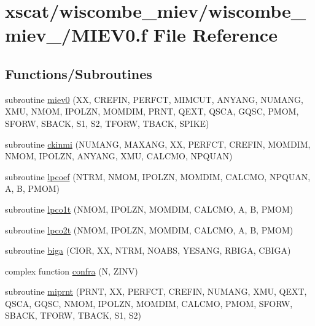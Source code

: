 \hypertarget{wiscombe__miev__1_2_m_i_e_v0_8f}{}\section{xscat/wiscombe\+\_\+miev/wiscombe\+\_\+miev\+\_/\+M\+I\+E\+V0.f File Reference}
\label{wiscombe__miev__1_2_m_i_e_v0_8f}
\subsection*{Functions/\+Subroutines}
\begin{DoxyCompactItemize}
\item 
subroutine \hyperlink{wiscombe__miev__1_2_m_i_e_v0_8f_a48092e733ab76cc9db0501ed3b28d9ff}{miev0} (XX, C\+R\+E\+F\+IN, P\+E\+R\+F\+CT, M\+I\+M\+C\+UT, A\+N\+Y\+A\+NG, N\+U\+M\+A\+NG, X\+MU, N\+M\+OM, I\+P\+O\+L\+ZN, M\+O\+M\+D\+IM, P\+R\+NT, Q\+E\+XT, Q\+S\+CA, G\+Q\+SC, P\+M\+OM, S\+F\+O\+RW, S\+B\+A\+CK, S1, S2, T\+F\+O\+RW, T\+B\+A\+CK, S\+P\+I\+KE)
\item 
subroutine \hyperlink{wiscombe__miev__1_2_m_i_e_v0_8f_aeb0cfc95aa7e21e9ada7c4cb634d6c92}{ckinmi} (N\+U\+M\+A\+NG, M\+A\+X\+A\+NG, XX, P\+E\+R\+F\+CT, C\+R\+E\+F\+IN, M\+O\+M\+D\+IM, N\+M\+OM, I\+P\+O\+L\+ZN, A\+N\+Y\+A\+NG, X\+MU, C\+A\+L\+C\+MO, N\+P\+Q\+U\+AN)
\item 
subroutine \hyperlink{wiscombe__miev__1_2_m_i_e_v0_8f_a8f1c192fc6a73a6b9e55d5a52de1f201}{lpcoef} (N\+T\+RM, N\+M\+OM, I\+P\+O\+L\+ZN, M\+O\+M\+D\+IM, C\+A\+L\+C\+MO, N\+P\+Q\+U\+AN, A, B, P\+M\+OM)
\item 
subroutine \hyperlink{wiscombe__miev__1_2_m_i_e_v0_8f_a6fcb83505689f74c82cf122a250675b6}{lpco1t} (N\+M\+OM, I\+P\+O\+L\+ZN, M\+O\+M\+D\+IM, C\+A\+L\+C\+MO, A, B, P\+M\+OM)
\item 
subroutine \hyperlink{wiscombe__miev__1_2_m_i_e_v0_8f_af491bde683b4a07ee245f9c3e53c6894}{lpco2t} (N\+M\+OM, I\+P\+O\+L\+ZN, M\+O\+M\+D\+IM, C\+A\+L\+C\+MO, A, B, P\+M\+OM)
\item 
subroutine \hyperlink{wiscombe__miev__1_2_m_i_e_v0_8f_affcbe26d3e8beb59e07c207f2b0da43a}{biga} (C\+I\+OR, XX, N\+T\+RM, N\+O\+A\+BS, Y\+E\+S\+A\+NG, R\+B\+I\+GA, C\+B\+I\+GA)
\item 
complex function \hyperlink{wiscombe__miev__1_2_m_i_e_v0_8f_ad91aace4d77229d367c28c78965a0bd5}{confra} (N, Z\+I\+NV)
\item 
subroutine \hyperlink{wiscombe__miev__1_2_m_i_e_v0_8f_ac887bd1b637c8d2b27df19d1163aad55}{miprnt} (P\+R\+NT, XX, P\+E\+R\+F\+CT, C\+R\+E\+F\+IN, N\+U\+M\+A\+NG, X\+MU, Q\+E\+XT, Q\+S\+CA, G\+Q\+SC, N\+M\+OM, I\+P\+O\+L\+ZN, M\+O\+M\+D\+IM, C\+A\+L\+C\+MO, P\+M\+OM, S\+F\+O\+RW, S\+B\+A\+CK, T\+F\+O\+RW, T\+B\+A\+CK, S1, S2)

\end{DoxyCompactItemize}
